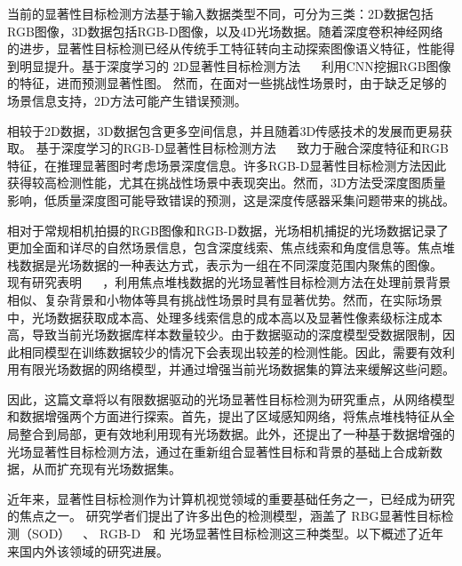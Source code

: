 当前的显著性目标检测方法基于输入数据类型不同，可分为三类：2D数据包括RGB图像，3D数据包括RGB-D图像，以及4D光场数据。随着深度卷积神经网络的进步，显著性目标检测已经从传统手工特征转向主动探索图像语义特征，性能得到明显提升。基于深度学习的
2D显著性目标检测方法
~\cite{feng2019attentive,wu2019cascaded,wu2019mutual,liu2019simple,liu2018picanet,wang2018detect,hou2017deeply,liu2016dhsnet,wang2016saliency}~
利用CNN挖掘RGB图像的特征，进而预测显著性图。
然而，在面对一些挑战性场景时，由于缺乏足够的场景信息支持，2D方法可能产生错误预测。

相较于2D数据，3D数据包含更多空间信息，并且随着3D传感技术的发展而更易获取。
基于深度学习的RGB-D显著性目标检测方法
~\cite{cong2019going,li2020asif,cong2017iterative,chen2019three,piao2019depth,chen2018progressively}~
致力于融合深度特征和RGB特征，在推理显著图时考虑场景深度信息。许多RGB-D显著性目标检测方法因此获得较高检测性能，尤其在挑战性场景中表现突出。然而，3D方法受深度图质量影响，低质量深度图可能导致错误的预测，这是深度传感器采集问题带来的挑战。

相对于常规相机拍摄的RGB图像和RGB-D数据，光场相机捕捉的光场数据记录了更加全面和详尽的自然场景信息，包含深度线索、焦点线索和角度信息等。焦点堆栈数据是光场数据的一种表达方式，表示为一组在不同深度范围内聚焦的图像。
现有研究表明
~\cite{piao2019deep,zhang2020light,wang2019deep,zhang2019memory,zhang2020lfnet,piao2021panet}~
，利用焦点堆栈数据的光场显著性目标检测方法在处理前景背景相似、复杂背景和小物体等具有挑战性场景时具有显著优势。然而，在实际场景中，光场数据获取成本高、处理多线索信息的成本高以及显著性像素级标注成本高，导致当前光场数据库样本数量较少。由于数据驱动的深度模型受数据限制，因此相同模型在训练数据较少的情况下会表现出较差的检测性能。因此，需要有效利用有限光场数据的网络模型，并通过增强当前光场数据集的算法来缓解这些问题。

因此，这篇文章将以有限数据驱动的光场显著性目标检测为研究重点，从网络模型和数据增强两个方面进行探索。首先，提出了区域感知网络，将焦点堆栈特征从全局整合到局部，更有效地利用现有光场数据。此外，还提出了一种基于数据增强的光场显著性目标检测方法，通过在重新组合显著性目标和背景的基础上合成新数据，从而扩充现有光场数据集。  




近年来，显著性目标检测作为计算机视觉领域的重要基础任务之一，已经成为研究的焦点之一。
研究学者们提出了许多出色的检测模型，涵盖了
RBG显著性目标检测（SOD）~\cite{ ma2021pyramidal, wei2020f3net, zhou2020interactive}~、
RGB-D~\cite{ cong2022cir, ji2021calibrated, liu2021visual}~和
光场显著性目标检测这三种类型。以下概述了近年来国内外该领域的研究进展。







